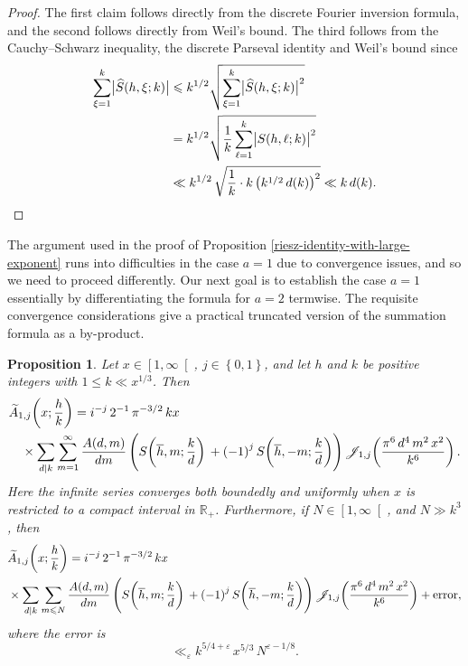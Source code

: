 \documentclass[a4paper,10pt,twoside]{amsart}
\newtheorem{proposition}[theorem]{Proposition}
\theoremstyle{definition}
\numberwithin{equation}{section}
\newcommand\eps{\varepsilon}
\renewcommand\:{\colon}
\begin{document}
\begin{proof}
The first claim follows directly from the discrete Fourier inversion formula, and the second follows directly from Weil's bound. The third follows from the Cauchy--Schwarz inequality, the discrete Parseval identity and Weil's bound since
\begin{align*}
\sum_{\xi=1}^k\bigl|\widehat S(h,\xi;k)\bigr|
&\leqslant k^{1/2}\sqrt{\sum_{\xi=1}^k\bigl|\widehat S(h,\xi;k)\bigr|^2}\\
&=k^{1/2}\sqrt{\frac1k\sum_{\ell=1}^k\bigl|S(h,\ell;k)\bigr|^2}\\
&\ll k^{1/2}\,\sqrt{\frac1k\cdot k\left(k^{1/2}\,d(k)\right)^2}\ll k\,d(k). \qedhere\end{align*}
\end{proof}

\noindent The argument used in the proof of Proposition \ref{riesz-identity-with-large-exponent} runs into difficulties in the case $a=1$ due to convergence issues, and so we need to proceed differently. Our next goal is to establish the case $a=1$ essentially by differentiating the formula for $a=2$ termwise. The requisite convergence considerations give a practical truncated version of the summation formula as a by-product.
\begin{proposition}\label{riesz-identity-a1}
Let $x\in\left[1,\infty\right[$, $j\in\left\{0,1\right\}$, and let $h$ and $k$ be positive integers with $1\leqslant k\ll x^{1/3}$. Then
\begin{align*}   
&\widetilde A_{1,j}\!\left(x;\frac hk\right)
=i^{-j}\,2^{-1}\,\pi^{-3/2}\,kx\\
&\quad\times\sum_{d\mid k}\sum_{m=1}^\infty\frac{A(d,m)}{dm}\left(S\!\left(\overline h,m;\frac kd\right)\vphantom{\Bigg|}+\left(-1\right)^jS\!\left(\overline h,-m;\frac kd\right)\right)\mathscr J_{1,j}\!\left(\frac{\pi^6\,d^4\,m^2\,x^2}{k^6}\right).
\end{align*}
Here the infinite series converges both boundedly and uniformly when $x$ is restricted to a compact interval in $\mathbb R_+$.  Furthermore, if $N\in\left[1,\infty\right[$, and $N\gg k^{3}$, then
\begin{align*}
&\widetilde A_{1,j}\!\left(x;\frac hk\right)
=i^{-j}\,2^{-1}\,\pi^{-3/2}\,kx\\&\times\sum_{d\mid k}\sum_{m\leqslant N}\frac{A(d,m)}{dm}\left(S\!\left(\overline h,m;\frac kd\right)\vphantom{\Bigg|}+\left(-1\right)^jS\!\left(\overline h,-m;\frac kd\right)\right)\mathscr J_{1,j}\!\left(\frac{\pi^6\,d^4\,m^2\,x^2}{k^6}\right)+\text{error},
\end{align*}
where the error is
\[\ll_\eps k^{5/4+\eps}\,x^{5/3}\,N^{\varepsilon-1/8}.\]
\end{proposition}
\end{document}
